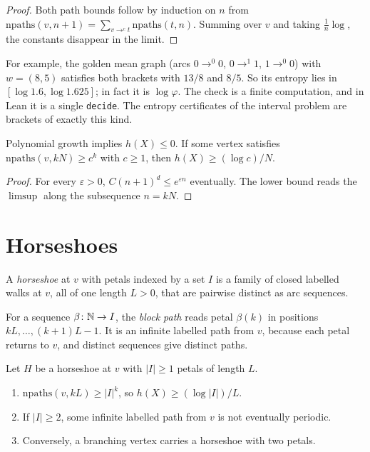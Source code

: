 \begin{proof}
Both path bounds follow by induction on \(n\) from
\(\mathrm{npaths}(v,n+1)=\sum_{v\to^c t}\mathrm{npaths}(t,n)\). Summing over \(v\) and taking
\(\frac1n\log\), the constants disappear in the limit.
\end{proof}

For example, the golden mean graph (arcs \(0\to^0 0\), \(0\to^1 1\), \(1\to^0 0\)) with
\(w=(8,5)\) satisfies both brackets with \(13/8\) and \(8/5\). So its entropy lies in
\([\log 1.6,\log 1.625]\); in fact it is \(\log\varphi\). The check is a finite computation, and
in Lean it is a single \texttt{decide}. The entropy certificates of the interval problem are
brackets of exactly this kind.

\begin{proposition}\label{prop:entropy-poly}
Polynomial growth implies \(h(X)\le0\). If some vertex satisfies \(\mathrm{npaths}(v,kN)\ge c^k\)
with \(c\ge1\), then \(h(X)\ge(\log c)/N\).
\end{proposition}

\begin{proof}
For every \(\varepsilon>0\), \(C(n+1)^d\le e^{\varepsilon n}\) eventually. The lower bound reads
the \(\limsup\) along the subsequence \(n=kN\).
\end{proof}

\section{Horseshoes}\label{sec:horseshoe}

\begin{definition}\label{def:horseshoe}
A \emph{horseshoe} at \(v\) with petals indexed by a set \(I\) is a family of closed labelled
walks at \(v\), all of one length \(L>0\), that are pairwise distinct as arc sequences.
\end{definition}

For a sequence \(\beta\colon\mathbb{N}\to I\), the \emph{block path} reads petal \(\beta(k)\) in
positions \(kL,\dots,(k+1)L-1\). It is an infinite labelled path from \(v\), because each petal
returns to \(v\), and distinct sequences give distinct paths.

\begin{theorem}\label{thm:horseshoe}
Let \(H\) be a horseshoe at \(v\) with \(|I|\ge1\) petals of length \(L\).
\begin{enumerate}[label=(\alph*)]
\item \(\mathrm{npaths}(v,kL)\ge|I|^k\), so \(h(X)\ge(\log|I|)/L\).
\item If \(|I|\ge2\), some infinite labelled path from \(v\) is not eventually periodic.
\item Conversely, a branching vertex carries a horseshoe with two petals.
\end{enumerate}
\end{theorem}

